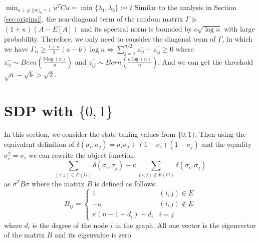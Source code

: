 \documentclass{ctexart}
\newcommand{\A}{\frac{a \log(n)}{n}}
\newcommand{\B}{\frac{b \log(n)}{n}}
\begin{document}
$\min_{u \perp g, ||u||_2=1} u^T C u = \min\{\lambda_1, \lambda_2\} := t$
Similar to the analysis in Section \ref{sec:original}, the non-diagonal term of the random matrix $\Gamma$ is $(1+\kappa)(A-E[A])$ and its
spectral norm is bounded by $c\sqrt{\log n}$ with large probability.
Therefore, we only need to consider the diagonal term of $\Gamma$, in which we have
$\Gamma_{ii} \geq \frac{1+\kappa}{2}(a-b)\log n \iff \sum_{j=1}^{n/2} z^-_{ij} - z^+_{ij} \geq 0$
where $z^-_{ij} \sim Bern(\B)$ and $z^+_{ij} \sim Bern(\A)$.
And we can get the threshold $\sqrt{a} - \sqrt{b} > \sqrt{2}$.

\section{SDP with $\{0,1\}$}
In this section, we consider the state taking values from $\{0,1\}$. Then using
the equivalent definition of $\delta(\sigma_i, \sigma_j) = \sigma_i \sigma_j + (1-\sigma_i)(1-\sigma_j)$ and
the equality $\sigma_i^2 =\sigma_i$
we can rewrite the object function
\begin{equation}
\sum_{(i,j)\in E(G)} \delta(\sigma_i, \sigma_j) -
\kappa \sum_{(i,j) \not\in E(G)} \delta(\sigma_i, \sigma_j)
\end{equation}
as $\sigma^T B \sigma$ where the matrix $B$ is defined as follows:
\begin{equation}
B_{ij} = \begin{cases}
1 & (i,j) \in E \\
-\kappa & (i,j) \not\in E\\
\kappa (n-1 - d_i) - d_i & i=j
\end{cases}
\end{equation}
where $d_i$ is the degree of the node $i$ in the graph.
All one vector is the eigenvector of the  matrix $B$ and its eigenvalue is zero.

\end{document}
